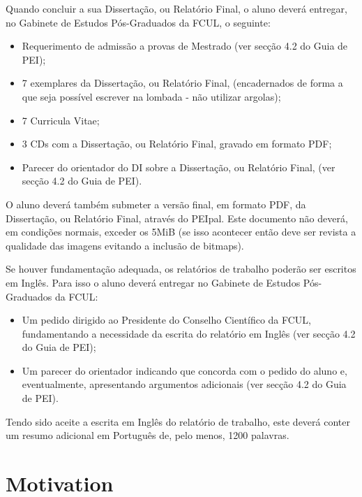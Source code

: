 Quando concluir a sua Dissertação, ou Relatório Final, o aluno deverá entregar, no Gabinete de Estudos Pós-Graduados da FCUL, o seguinte:

\begin{itemize}
\item Requerimento de admissão a provas de Mestrado (ver secção 4.2 do Guia de PEI);
\item 7 exemplares da Dissertação, ou Relatório Final, (encadernados de forma a que seja possível escrever na lombada - não utilizar argolas);
\item 7 Curricula Vitae;
\item 3 CDs com a Dissertação, ou Relatório Final, gravado em formato PDF;
\item Parecer do orientador do DI sobre a Dissertação, ou Relatório Final, (ver secção 4.2 do Guia de PEI).
\end{itemize}

O aluno deverá também submeter a versão final, em formato PDF, da Dissertação, ou Relatório Final, através do PEIpal. Este documento não deverá, em condições normais, exceder os 5MiB (se isso acontecer então deve ser revista a qualidade das imagens evitando a inclusão de bitmaps).

Se houver fundamentação adequada, os relatórios de trabalho poderão ser escritos em Inglês. Para isso o aluno deverá entregar no Gabinete de Estudos Pós-Graduados da FCUL:

\begin{itemize}
\item Um pedido dirigido ao Presidente do Conselho Científico da FCUL, fundamentando a necessidade da escrita do relatório em Inglês (ver secção 4.2 do Guia de PEI);
\item Um parecer do orientador indicando que concorda com o pedido do aluno e, eventualmente, apresentando argumentos adicionais (ver secção 4.2 do Guia de PEI).
\end{itemize}

Tendo sido aceite a escrita em Inglês do relatório de trabalho, este deverá conter um resumo adicional em Português de, pelo menos, 1200 palavras.

\section{Motivation}

